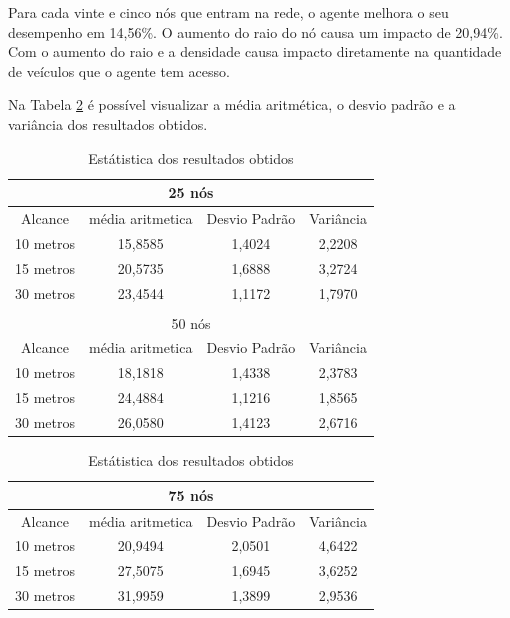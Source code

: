	Para cada vinte e cinco nós que entram na rede, o agente melhora o seu desempenho em 14,56\%. O aumento do raio do nó causa um impacto de 20,94\%. Com o aumento do raio e a densidade causa impacto diretamente na quantidade de veículos que o agente tem acesso.

	Na Tabela \ref{tab:estatiscaResultadosObtidosComInfraestrutura} é possível visualizar a média aritmética, o desvio padrão e a variância dos resultados obtidos.

	\begin{table}[!htb]
	    \caption{Estátistica dos resultados obtidos}
	    \label{tab:estatiscaResultadosObtidosComInfraestrutura}
	    \centering
	    \tiny
	    \begin{minipage}{.5\linewidth}
	      
	      \centering
	        \begin{tabular}{|c|c|c|c|}

			\hline
			\multicolumn{4}{|c|}{25 nós} \\ \hline
			Alcance   & média aritmetica &	Desvio Padrão &	Variância  \\ \hline
			10 metros &	15,8585 & 1,4024 & 2,2208  \\ \hline
			15 metros &	20,5735 & 1,6888 & 3,2724  \\ \hline
			30 metros &	23,4544 & 1,1172 & 1,7970 \\ \hline

			\multicolumn{4}{|c|}{} \\ \hline

			\multicolumn{4}{|c|}{50 nós} \\ \hline
			Alcance   & média aritmetica &	Desvio Padrão &	Variância  \\ \hline
			10 metros &	18,1818 & 1,4338 & 2,3783  \\ \hline
			15 metros &	24,4884 & 1,1216 & 1,8565  \\ \hline
			30 metros &	26,0580 & 1,4123 & 2,6716 \\ \hline

		\end{tabular}
	    \end{minipage}%
	    \begin{minipage}{.5\linewidth}
	      \centering
	        \begin{tabular}{|c|c|c|c|}
	        \hline
			\multicolumn{4}{|c|}{75 nós} \\ \hline
			Alcance   & média aritmetica &	Desvio Padrão &	Variância  \\ \hline
			10 metros &	20,9494 & 2,0501 & 4,6422  \\ \hline
			15 metros &	27,5075 & 1,6945 & 3,6252  \\ \hline
			30 metros &	31,9959 & 1,3899 & 2,9536 \\ \hline


\end{tabular}
\end{minipage}
\end{table}
